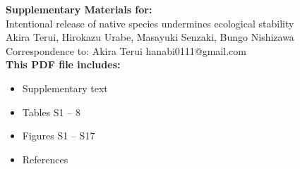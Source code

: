 \begin{flushleft}
\vspace*{5mm}
\LARGE{\textbf{Supplementary Materials for:}}\\[2.5mm]
\LARGE{Intentional release of native species undermines ecological stability}\\[7.5mm]
\large{Akira Terui, Hirokazu Urabe, Masayuki Senzaki, Bungo Nishizawa}\\[7.5mm]
\large{Correspondence to: Akira Terui hanabi0111@gmail.com}\\[15mm]
\textbf{This PDF file includes:}
\begin{itemize}
\item Supplementary text
\item Tables S1 -- 8
\item Figures S1 -- S17
\item References
\end{itemize}
\end{flushleft}

\newpage